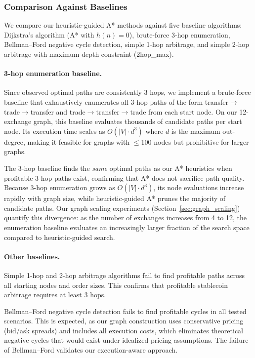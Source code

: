 \subsubsection{Comparison Against Baselines}

We compare our heuristic-guided A* methods against five baseline algorithms: Dijkstra's algorithm (A* with $h(n) = 0$), brute-force 3-hop enumeration, Bellman--Ford negative cycle detection, simple 1-hop arbitrage, and simple 2-hop arbitrage with maximum depth constraint (2hop\_max).

\paragraph{3-hop enumeration baseline.}
Since observed optimal paths are consistently 3 hops, we implement a brute-force baseline that exhaustively enumerates all 3-hop paths of the form transfer$\to$trade$\to$transfer and trade$\to$transfer$\to$trade from each start node. On our 12-exchange graph, this baseline evaluates thousands of candidate paths per start node. Its execution time scales as $O(|V| \cdot d^3)$ where $d$ is the maximum out-degree, making it feasible for graphs with $\leq$100 nodes but prohibitive for larger graphs.

The 3-hop baseline finds the \emph{same} optimal paths as our A* heuristics when profitable 3-hop paths exist, confirming that A* does not sacrifice path quality. Because 3-hop enumeration grows as $O(|V| \cdot d^3)$, its node evaluations increase rapidly with graph size, while heuristic-guided A* prunes the majority of candidate paths. Our graph scaling experiments (Section~\ref{sec:graph_scaling}) quantify this divergence: as the number of exchanges increases from 4 to 12, the enumeration baseline evaluates an increasingly larger fraction of the search space compared to heuristic-guided search.

\paragraph{Other baselines.}
Simple 1-hop and 2-hop arbitrage algorithms fail to find profitable paths across all starting nodes and order sizes. This confirms that profitable stablecoin arbitrage requires at least 3 hops.

Bellman--Ford negative cycle detection fails to find profitable cycles in all tested scenarios. This is expected, as our graph construction uses conservative pricing (bid/ask spreads) and includes all execution costs, which eliminates theoretical negative cycles that would exist under idealized pricing assumptions. The failure of Bellman--Ford validates our execution-aware approach.


